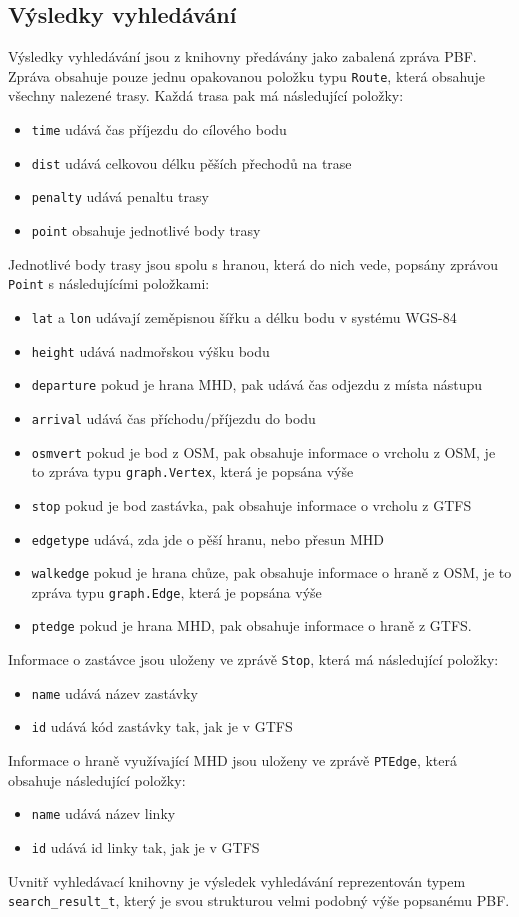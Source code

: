 \subsection{Výsledky vyhledávání}
Výsledky vyhledávání jsou z knihovny předávány jako zabalená zpráva PBF. Zpráva
obsahuje pouze jednu opakovanou položku typu {\tt Route}, která obsahuje všechny
nalezené trasy. Každá trasa pak má následující položky: 
\begin{itemize}
	\item {\tt time} udává čas příjezdu do cílového bodu
	\item {\tt dist} udává celkovou délku pěších přechodů na trase
	\item {\tt penalty} udává penaltu trasy
	\item {\tt point} obsahuje jednotlivé body trasy
\end{itemize}
Jednotlivé body trasy jsou spolu s hranou, která do nich vede, popsány zprávou
{\tt Point} s následujícími položkami: 
\begin{itemize}
	\item {\tt lat} a {\tt lon} udávají zeměpisnou šířku a délku bodu v
	systému WGS-84
	\item {\tt height} udává nadmořskou výšku bodu
	\item {\tt departure} pokud je hrana MHD, pak udává čas odjezdu z místa
	nástupu
	\item {\tt arrival} udává čas příchodu/příjezdu do bodu 
	\item {\tt osmvert} pokud je bod z OSM, pak obsahuje informace o vrcholu
	z OSM, je to zpráva typu {\tt graph.Vertex}, která je popsána výše
	\item {\tt stop} pokud je bod zastávka, pak obsahuje informace o vrcholu z GTFS
	\item {\tt edgetype} udává, zda jde o pěší hranu, nebo přesun MHD
	\item {\tt walkedge} pokud je hrana chůze, pak obsahuje informace o
	hraně z OSM, je to zpráva typu {\tt graph.Edge}, která je popsána výše
	\item {\tt ptedge} pokud je hrana MHD, pak obsahuje informace o hraně z
	GTFS.
\end{itemize}
Informace o zastávce jsou uloženy ve zprávě {\tt Stop}, která má následující
položky:
\begin{itemize}
	\item {\tt name} udává název zastávky
	\item {\tt id} udává kód zastávky tak, jak je v GTFS
\end{itemize}
Informace o hraně využívající MHD jsou uloženy ve zprávě {\tt PTEdge}, která
obsahuje následující položky:
\begin{itemize}
	\item {\tt name} udává název linky
	\item {\tt id} udává id linky tak, jak je v GTFS
\end{itemize}
Uvnitř vyhledávací knihovny je výsledek vyhledávání reprezentován typem {\tt
search\_result\_t}, který je svou strukturou velmi podobný výše popsanému PBF.

